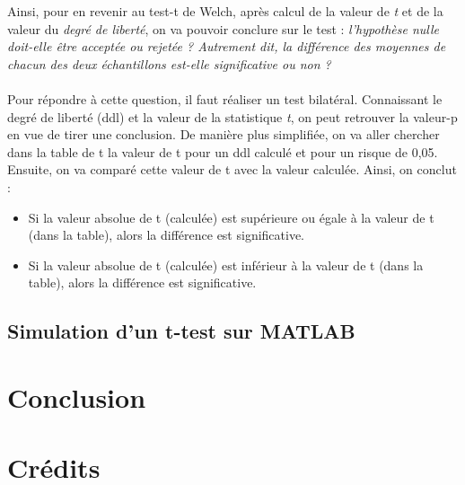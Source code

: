 \documentclass[10pt, oneside, a4paper]{article}
\begin{document}
Ainsi, pour en revenir au test-t de Welch, après calcul de la valeur de \textit{t} et de la valeur du \textit{degré de liberté}, on va pouvoir conclure sur le test : \textit{l'hypothèse nulle doit-elle être acceptée ou rejetée ? Autrement dit, la différence des moyennes de chacun des deux échantillons est-elle significative ou non ?} \\ \\
Pour répondre à cette question, il faut réaliser un test bilatéral. Connaissant le degré de liberté (ddl) et la valeur de la statistique \textit{t}, on peut retrouver la valeur-p en vue de tirer une conclusion. De manière plus simplifiée, on va aller chercher dans la table de t la valeur de t pour un ddl calculé et pour un risque {\alpha} de 0,05. Ensuite, on va comparé cette valeur de t avec la valeur calculée. Ainsi, on conclut :
\begin{itemize}
\item Si la valeur absolue de t (calculée) est supérieure ou égale à la valeur de t (dans la table), alors la différence est significative. 
\item Si la valeur absolue de t (calculée) est inférieur à la valeur de t (dans la table), alors la différence est significative.
\end{itemize}


\subsection{Simulation d'un t-test sur MATLAB}


\newpage
\section{Conclusion}


\newpage
\pagebreak
{}
\section*{Crédits}
\end{document}
